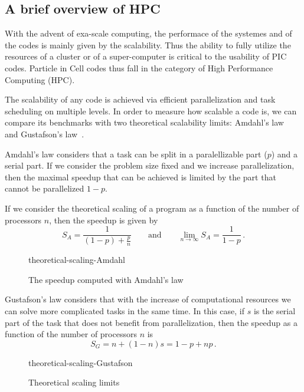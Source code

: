 \documentclass[12pt, class=report, crop=false]{standalone}
\begin{document}
\subsection{A brief overview of HPC}

With the advent of exa-scale computing, the performace of the systemes and of the
codes is mainly given by the scalability.
Thus the ability to fully utilize the resources of a cluster or of a super-computer
is critical to the usability of PIC codes. Particle in Cell codes thus fall in
the category of High Performance Computing (HPC).

The scalability of any code is achieved via efficient parallelization and task
scheduling on multiple levels.
In order to measure how scalable a code is, we can compare its benchmarks with
two theoretical scalability limits: Amdahl's law~\autocite{amdahl_validitysingle_1967}
and Gustafson's law~\autocite{gustafson_reevaluatingamdahl_1988}.

Amdahl's law considers that a task can be split in a paralellizable part (\(p\)) and a
serial part. If we consider the problem size fixed and we increase parallelization,
then the maximal speedup that can be achieved is limited by the part that cannot
be parallelized \(1-p\).

If we consider the theoretical scaling of a program as a function of the number
of processors \(n\), then the speedup is given by
\[
S_A = \frac{1}{(1-p)+\frac{p}{n}}
\qquad \text{and} \qquad
\lim_{n\to\infty} S_A = \frac{1}{1-p}\,.
\]

\begin{figure}[hb]
  \centering
  {theoretical-scaling-Amdahl}%
  \caption{The speedup computed with Amdahl's law}\label{fig:theoretical-scaling-Amdahl}%
\end{figure}

Gustafson's law considers that with the increase of computational resources we
can solve more complicated tasks in the same time. In this case, if \(s\) is the
serial part of the task that does not benefit from parallelization, then the speedup
as a function of the number of processors \(n\) is
\[
S_G = n + (1-n)s = 1 - p + np\,.
\]

\begin{figure}[h]
  \centering
  {theoretical-scaling-Gustafson}%
  \caption{Theoretical scaling limits}\label{fig:theoretical-scaling-Gustafson}%
\end{figure}
\end{document}
